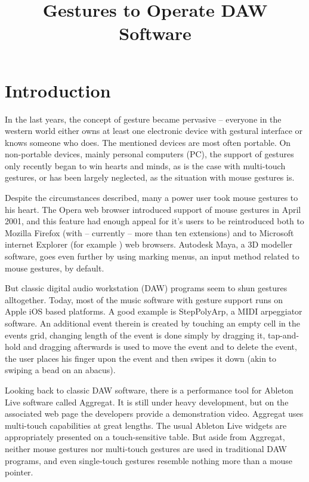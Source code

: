 \documentclass{aes130}
\affiliation[1]{Universit\"{a}t Oldenburg, D-26111-Oldenburg, Germany}
\affiliation[2]{Fachhochschule Bielefeld (University of Applied Sciences), D-33602-Bielefeld, Germany}
\title{Gestures to Operate DAW Software}
\begin{document}
\maketitle

\section{Introduction}

In the last years, the concept of gesture became pervasive -- everyone in the western world either owns
at least one electronic device with gestural interface or knows someone who does. The mentioned devices
are most often portable. On non-portable devices, mainly personal computers (PC), the support of gestures
only recently began to win hearts and minds, as is the case with multi-touch gestures, or has been largely neglected,
as the situation with mouse gestures is.

Despite the circumstances described, many a power user took mouse gestures to his heart. The Opera web browser
introduced support of mouse gestures in April 2001\cite{WikipediaMouseGesture}, and this feature
had enough appeal for it's users to be reintroduced both to Mozilla Firefox (with -- currently -- more
than ten extensions\cite{FirefoxGestureExtensions}) and to Microsoft internet Explorer
(for example \cite{InternetExplorerGestures}) web browsers. Autodesk Maya, a 3D modeller software,
goes even further by using marking menus\cite{Kurtenbach:1994:ULP:259963.260376}, an input method related
to mouse gestures, by default.

But classic digital audio workstation (DAW) programs seem to shun gestures alltogether. Today,
most of the music software with gesture support runs on Apple iOS based platforms. A good example is
StepPolyArp\cite{StepPolyArp}, a MIDI arpeggiator software.
An additional event therein is created by touching an empty cell in the events grid\cite{StepPolyArpManual},
changing length of the event is done simply by dragging it, tap-and-hold and dragging afterwards is used to move the event
and to delete the event, the user places his finger upon the event and then swipes it down (akin to swiping a bead on an abacus).

Looking back to classic DAW software, there is a performance tool for Ableton Live software called Aggregat\cite{Aggregat}.
It is still under heavy development, but on the associated web page the developers provide a demonstration video.
Aggregat uses multi-touch capabilities at great lengths. The usual Ableton Live widgets are appropriately presented
on a touch-sensitive table. But aside from Aggregat, neither mouse gestures nor multi-touch gestures are used
in traditional DAW programs, and even single-touch gestures resemble nothing more than a mouse pointer.
\end{document}
